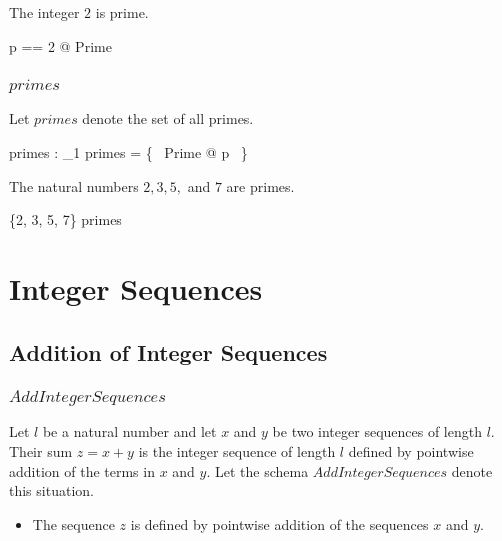 \documentclass[11pt, oneside]{article}
\begin{document}
\begin{example}
The integer $2$ is prime.

\begin{zed}
	\LET p == 2 @ Prime
\end{zed}
\end{example}

\subsubsection{$primes$}

Let $primes$ denote the set of all primes.

\begin{axdef}
	primes : \power \nat_1
\where
	primes = \{~ Prime @ p ~\}
\end{axdef}

\begin{example}
The natural numbers $2, 3, 5,$ and $7$ are primes.

\begin{zed}
	\{2, 3, 5, 7\} \subseteq primes
\end{zed}
\end{example}

\section{Integer Sequences}

\subsection{Addition of Integer Sequences}

\subsubsection{$AddIntegerSequences$}

Let $l$ be a natural number and
let $x$ and $y$ be two integer sequences of length $l$.
Their sum $z = x + y$ is the integer sequence of length $l$ defined by pointwise addition
of the terms in $x$ and $y$.
Let the schema $AddIntegerSequences$ denote this situation.

\begin{itemize}
	\item The sequence $z$ is defined by pointwise addition of the sequences $x$ and $y$.
\end{itemize}
\end{document}
